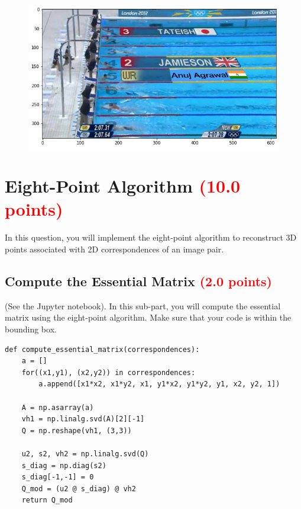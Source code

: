 \documentclass[answers]{exam}
\newcommand{\mypoints}[1]{\textcolor{red}{(#1 points)}}
\begin{document}
\begin{solution}
\begin{figure}[H]
    \centering
    \includegraphics[width=0.9\linewidth]{Images/question_4_Anuj.png}
\end{figure}
\end{solution}

\newpage
\section{Eight-Point Algorithm \mypoints{10.0}}

In this question, you will implement the eight-point algorithm to reconstruct 3D points associated with 2D correspondences of an image pair.

\subsection{Compute the Essential Matrix \mypoints{2.0}}
(See the Jupyter notebook). In this sub-part, you will compute the essential matrix using the eight-point algorithm. Make sure that your code is within the bounding box.
\begin{solution}
\begin{verbatim}
def compute_essential_matrix(correspondences):
    a = []
    for((x1,y1), (x2,y2)) in correspondences:
        a.append([x1*x2, x1*y2, x1, y1*x2, y1*y2, y1, x2, y2, 1])
        
    A = np.asarray(a)
    vh1 = np.linalg.svd(A)[2][-1]
    Q = np.reshape(vh1, (3,3))
    
    u2, s2, vh2 = np.linalg.svd(Q)
    s_diag = np.diag(s2)
    s_diag[-1,-1] = 0
    Q_mod = (u2 @ s_diag) @ vh2
    return Q_mod
\end{verbatim}

\end{solution}
\end{document}
